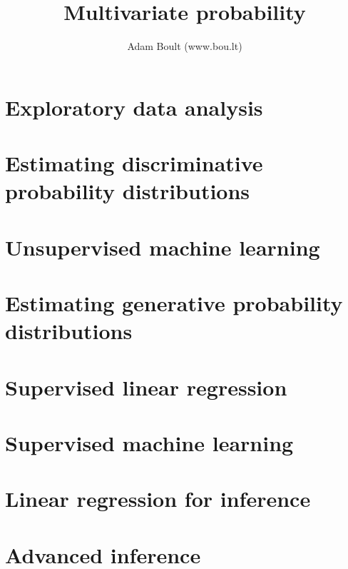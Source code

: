 \documentclass[oneside]{book}
\begin{document}
\author{Adam Boult (www.bou.lt)}
\title{Multivariate probability}
\maketitle

\setcounter{tocdepth}{0}
\tableofcontents



\part{Exploratory data analysis}





\part{Estimating discriminative probability distributions}






\part{Unsupervised machine learning}



\part{Estimating generative probability distributions}



\part{Supervised linear regression}






\part{Supervised machine learning}


















\part{Linear regression for inference}






\part{Advanced inference}





\end{document}
